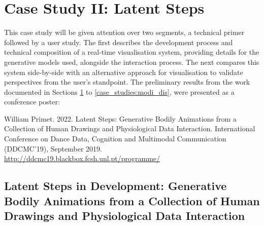 \chapter{Case Study II: Latent Steps}
\label{cha:cs_ii}


This case study will be given attention over two segments, a technical primer followed by a user study. The first describes the development process and technical composition of a real-time visualisation system, providing details for the generative models used, alongside the interaction process. The next compares this system side-by-side with an alternative approach for visualisation to validate perspectives from the user's standpoint. The preliminary results from the work documented in Sections \ref{cha:cs_ii} to \ref{case_studies:modi_dis}, were presented as a conference poster:

William Primet. 2022. Latent Steps: Generative Bodily Animations from a Collection of Human Drawings and Physiological Data Interaction. International Conference on Dance Data, Cognition and Multimodal Communication (DDCMC’19), September 2019.
\url{http://ddcmc19.blackbox.fcsh.unl.pt/programme/}




\section[Generative Bodily Animations from Body Maps]{Latent Steps in Development: Generative Bodily Animations from a Collection of Human Drawings and Physiological Data Interaction}
\label{case_studies:latent_steps}

